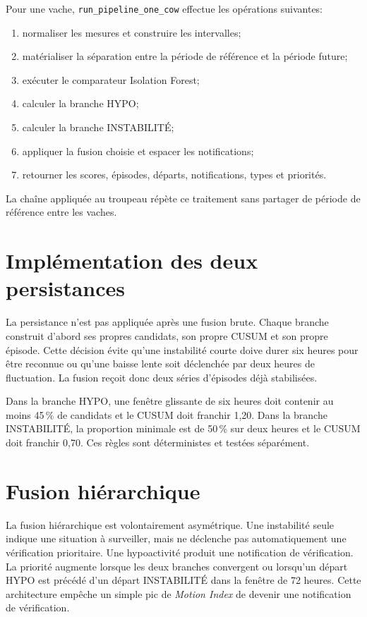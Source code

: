 Pour une vache, \texttt{run\_pipeline\_one\_cow} effectue les opérations suivantes:
\begin{enumerate}
  \item normaliser les mesures et construire les intervalles;
  \item matérialiser la séparation entre la période de référence et la période future;
  \item exécuter le comparateur Isolation Forest;
  \item calculer la branche HYPO;
  \item calculer la branche INSTABILITÉ;
  \item appliquer la fusion choisie et espacer les notifications;
  \item retourner les scores, épisodes, départs, notifications, types et priorités.
\end{enumerate}
La chaîne appliquée au troupeau répète ce traitement sans partager de période de référence
entre les vaches.

\section{Implémentation des deux persistances}

La persistance n'est pas appliquée après une fusion brute. Chaque branche construit d'abord
ses propres candidats, son propre CUSUM et son propre épisode. Cette décision évite qu'une
instabilité courte doive durer six heures pour être reconnue ou qu'une baisse lente soit
déclenchée par deux heures de fluctuation. La fusion reçoit donc deux séries d'épisodes déjà
stabilisées.

Dans la branche HYPO, une fenêtre glissante de six heures doit contenir au moins 45\,\% de
candidats et le CUSUM doit franchir 1,20. Dans la branche INSTABILITÉ, la proportion minimale
est de 50\,\% sur deux heures et le CUSUM doit franchir 0,70. Ces règles sont déterministes et
testées séparément.

\section{Fusion hiérarchique}

La fusion hiérarchique est volontairement asymétrique. Une instabilité seule indique une
situation à surveiller, mais ne déclenche pas automatiquement une vérification prioritaire.
Une hypoactivité produit une notification de vérification. La priorité augmente lorsque les deux
branches convergent ou lorsqu'un départ HYPO est précédé d'un départ INSTABILITÉ dans la
fenêtre de 72 heures. Cette architecture empêche un simple pic de \textit{Motion Index} de
devenir une notification de vérification.

